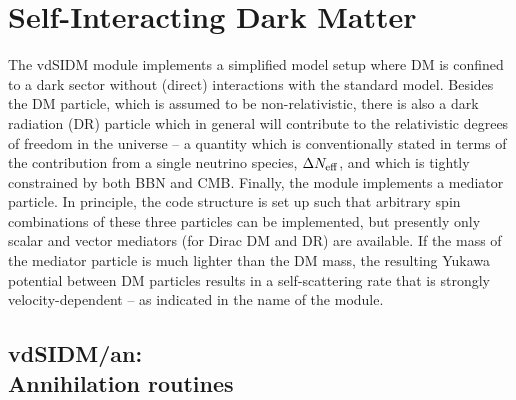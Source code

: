 \documentclass[a4paper,10pt,oneside]{book}
\newcommand{\code}[1]{\ft{#1}}
\newcommand{\codeb}[1]{\ftb{#1}}
\newcommand{\ft}[1]{\textsf{#1}}
\newcommand{\ftb}[1]{{\bfseries \sffamily #1}}
\begin{document}
\chapter{Self-Interacting Dark Matter}
\label{ch:vdSIDM}

The \code{vdSIDM} module implements a simplified model setup where DM is confined to a dark sector
without (direct) interactions with the standard model. Besides the DM particle, which is assumed to be non-relativistic,
there is also a dark radiation (DR) particle which in general will contribute to the relativistic degrees of freedom
in the universe -- a quantity which is conventionally stated in terms of the contribution from a single neutrino
species, $\Delta N_{\rm eff}$, and which is tightly constrained by both BBN and CMB. 
Finally, the module implements a mediator particle. In principle, the code structure is set up such that arbitrary 
spin combinations of these three particles can be implemented, but presently only scalar and vector mediators
(for Dirac DM and DR) are available.  If the mass of the mediator particle is much lighter than the DM mass,
the resulting Yukawa potential between DM particles results in a self-scattering rate that is strongly velocity-dependent
-- as indicated in the name of the module.

 
\section[vdSIDM/an: Annihilation routines]{\codeb{vdSIDM/an}:\\ Annihilation routines}
\label{sec:src_models/vdSIDM/an}

\label{ch:vdSIDM_an}
\end{document}
